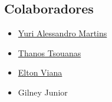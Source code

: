 \documentclass[12pt, a4paper]{article}
\begin{document}
\subsection{Colaboradores}
\begin{itemize}
\item \href{https://github.com/YuriAlessandro}{Yuri Alessandro Martins}
\item \href{http://www.tsouanas.org/}{Thanos Tsouanas}
\item \href{https://github.com/eltonvs}{Elton Viana}
\item Gilney Junior
\end{itemize}
\clearpage


\end{document}
